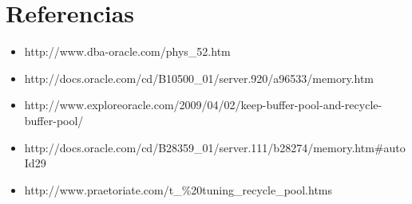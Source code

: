 \documentclass[10pt, a4paper,english,spanish]{article}
\begin{document}

\maketitle
\pagebreak

\tableofcontents
\pagebreak


\newpage


\newpage


\newpage

\section{Referencias}
\begin{itemize}
	\item http://www.dba-oracle.com/phys\_52.htm
	\item http://docs.oracle.com/cd/B10500\_01/server.920/a96533/memory.htm
	\item http://www.exploreoracle.com/2009/04/02/keep-buffer-pool-and-recycle-buffer-pool/
	\item http://docs.oracle.com/cd/B28359\_01/server.111/b28274/memory.htm\#autoId29
	\item http://www.praetoriate.com/t\_\%20tuning\_recycle\_pool.htms
\end{itemize}
\end{document}
